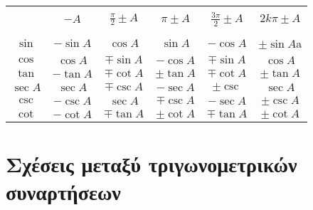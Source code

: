 \begin{center}
\begin{tabular}{*{6}c}
    \toprule \\
    & $ -A $  & $ \frac{\pi}{2} \pm A $ & $ \pi \pm A $ & $ \frac{3 \pi}{2}
    \pm A $ & $ 2k \pi \pm A $ \\
    \midrule \\
    $ \sin{} $ & $ - \sin{A} $ & $ \cos{A} $ & $ \sin{A} $ & $ - \cos{A}
    $ & $ \pm \sin{A} $a \\
    $ \cos $ & $ \cos{A}  $ & $ \mp \sin{A} $ & $ - \cos{A} $ & $ \mp
    \sin{A} $ & $ \cos{A} $ \\
    $ \tan{} $ & $ - \tan{A} $ & $ \mp \cot{A} $ & $ \pm \tan{A} $ & $ \mp
    \cot{A} $ & $ \pm \tan{A} $ \\
    $ \sec{A} $ & $ \sec{A} $ & $ \mp \csc{A} $ & $ - \sec{A} $ & $ \pm
    \csc{} $ & $ \sec{A} $ \\
    $ \csc{} $ & $ - \csc{A} $ & $ \sec{A} $ & $ \mp \csc{A} $ & $ - \sec{A}$ &
    $ \pm \csc{A} $ \\
    $ \cot{} $ & $ - \cot{A} $ & $ \mp \tan{A} $ & $ \pm \cot{A} $ & $ \mp
    \tan{A} $ & $ \pm \cot{A} $ \\ 
    \bottomrule
\end{tabular}
\end{center}


\section{Σχέσεις μεταξύ τριγωνομετρικών συναρτήσεων}

